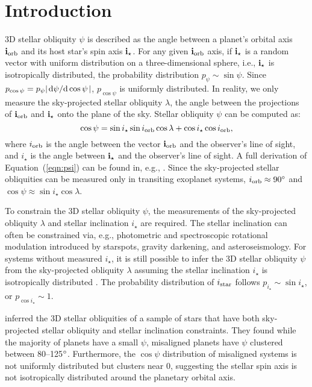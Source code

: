\documentclass[twocolumn,times]{aastex631}
\begin{document}
\section{Introduction}
\label{sec:intro}

3D stellar obliquity $\psi$ is described as the angle between a planet's orbital axis $\bf{i}_{\rm orb}$ and its host star's spin axis $\bf{i}_{\star}$.
For any given $\bf{i}_{\rm orb}$ axis, if $\bf{i}_{\star}$ is a random vector with uniform distribution on a three-dimensional sphere, i.e., $\bf{i}_{\star}$ is isotropically distributed, the probability distribution $p_{\psi} \sim \sin{\psi}$. Since $p_{\cos{\psi}} = p_{\psi} \abs{\dv*{\psi}{\cos{\psi}}}$, $p_{\cos{\psi}}$ is uniformly distributed.
In reality, we only measure the sky-projected stellar obliquity $\lambda$, the angle between the projections of $\bf{i}_{\rm orb}$ and $\bf{i}_{\star}$ onto the plane of the sky. Stellar obliquity $\psi$ can be computed as:
\begin{equation}\label{eqn:psi}
    \cos{\psi} = \sin{i_\star}\sin{i_{\rm orb}}\cos{\lambda} + \cos{i_\star}\cos{i_{\rm orb}},
\end{equation}
where $i_{\rm orb}$ is the angle between the vector $\bf{i}_{\rm orb}$ and the observer's line of sight, and $i_\star$ is the angle between $\bf{i}_{\star}$ and the observer's line of sight. A full derivation of Equation~(\ref{eqn:psi}) can be found in, e.g., \cite{Fabrycky09}.
Since the sky-projected stellar obliquities can be measured only in transiting exoplanet systems, $i_{\rm orb} \approx 90\mbox{$^\circ$}$ and $\cos{\psi} \approx \sin{i_\star}\cos{\lambda}$.

To constrain the 3D stellar obliquity $\psi$, the measurements of the sky-projected obliquity $\lambda$ and stellar inclination $i_\star$ are required. The stellar inclination can often be constrained via, e.g., photometric and spectroscopic rotational modulation introduced by starspots, gravity darkening, and asteroseismology. For systems without measured $i_\star$, it is still possible to infer the 3D stellar obliquity $\psi$ from the sky-projected obliquity $\lambda$ assuming the stellar inclination $i_\star$ is isotropically distributed \citep[e.g.,][]{Fabrycky09}. The probability distribution of $i_{\rm star}$ follows $p_{i_\star} \sim \sin{i_{\star}}$, or $p_{\cos{i_\star}} \sim 1$.

\cite{Albrecht21} inferred the 3D stellar obliquities of a sample of stars that have both sky-projected stellar obliquity and stellar inclination constraints. They found while the majority of planets have a small $\psi$, misaligned planets have $\psi$ clustered between 80--125$\mbox{$^\circ$}$. Furthermore, the $\cos{\psi}$ distribution of misaligned systems is not uniformly distributed but clusters near 0, suggesting the stellar spin axis is not isotropically distributed around the planetary orbital axis.
\end{document}
